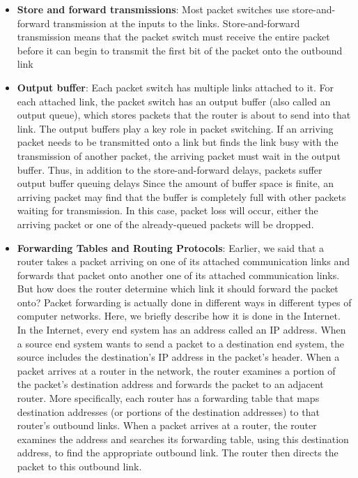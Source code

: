 \documentclass{report}
\begin{document}
\begin{itemize}
            \bigbreak \noindent 
            So, if a source end system or a packet switch is sending a packet of $L$ bits over a link with transmission rate $R$ bits/sec, then the time to transmit the packet is $L/R$ seconds.
        \item \textbf{Store and forward transmissions}: Most packet switches use store-and-forward transmission at the inputs to the links. Store-and-forward transmission means that the packet switch must receive the entire packet before it can begin to transmit the first bit of the packet onto the outbound link
        \item \textbf{Output buffer}: Each packet switch has multiple links attached to it. For each attached link, the packet switch has an output buffer (also called an output queue), which stores packets that the router is about to send into that link. The output buffers play a key role in packet switching. If an arriving packet needs to be transmitted onto a link but finds the link busy with the transmission of another packet, the arriving packet must wait in the output buffer. Thus, in addition to the store-and-forward delays, packets suffer output buffer queuing delays
            \bigbreak \noindent 
            Since the amount of buffer space is finite, an arriving packet may find that the buffer is completely full with other packets waiting for transmission. In this case, packet loss will occur, either the arriving packet or one of the already-queued packets will be dropped.
        \item \textbf{Forwarding Tables and Routing Protocols}: Earlier, we said that a router takes a packet arriving on one of its attached communication links and forwards that packet onto another one of its attached communication links. But how does the router determine which link it should forward the packet onto? Packet forwarding is actually done in different ways in different types of computer networks. Here, we briefly describe how it is done in the Internet.
            \bigbreak \noindent 
            In the Internet, every end system has an address called an IP address. When a source end system wants to send a packet to a destination end system, the source includes the destination’s IP address in the packet’s header.
            \bigbreak \noindent 
            When a packet arrives at a router in the network, the router examines a portion of the packet’s destination address and forwards the packet to an adjacent router. More specifically, each router has a forwarding table that maps destination addresses (or portions of the destination addresses) to that router’s outbound links. When a packet arrives at a router, the router examines the address and searches its forwarding table, using this destination address, to find the appropriate outbound link. The router then directs the packet to this outbound link.

\end{itemize}
\end{document}
